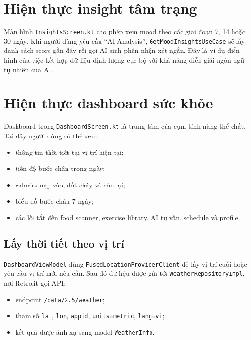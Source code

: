 \documentclass{zenbuddy-report}
\begin{document}

\section{Hiện thực insight tâm trạng}
Màn hình \texttt{InsightsScreen.kt} cho phép xem mood theo các giai đoạn 7, 14 hoặc 30 ngày. Khi người dùng yêu cầu ``AI Analysis'', \texttt{GetMoodInsightsUseCase} sẽ lấy danh sách score gần đây rồi gọi AI sinh phần nhận xét ngắn. Đây là ví dụ điển hình của việc kết hợp dữ liệu định lượng cục bộ với khả năng diễn giải ngôn ngữ tự nhiên của AI.


\section{Hiện thực dashboard sức khỏe}
Dashboard trong \texttt{DashboardScreen.kt} là trung tâm của cụm tính năng thể chất. Tại đây người dùng có thể xem:
\begin{itemize}
  \item thông tin thời tiết tại vị trí hiện tại;
  \item tiến độ bước chân trong ngày;
  \item calories nạp vào, đốt cháy và còn lại;
  \item biểu đồ bước chân 7 ngày;
  \item các lối tắt đến food scanner, exercise library, AI tư vấn, schedule và profile.
\end{itemize}


\subsection{Lấy thời tiết theo vị trí}
\texttt{DashboardViewModel} dùng \texttt{FusedLocationProviderClient} để lấy vị trí cuối hoặc yêu cầu vị trí mới nếu cần. Sau đó dữ liệu được gửi tới \texttt{WeatherRepositoryImpl}, nơi Retrofit gọi API:
\begin{itemize}
  \item endpoint \texttt{/data/2.5/weather};
  \item tham số \texttt{lat}, \texttt{lon}, \texttt{appid}, \texttt{units=metric}, \texttt{lang=vi};
  \item kết quả được ánh xạ sang model \texttt{WeatherInfo}.
\end{itemize}
\end{document}
